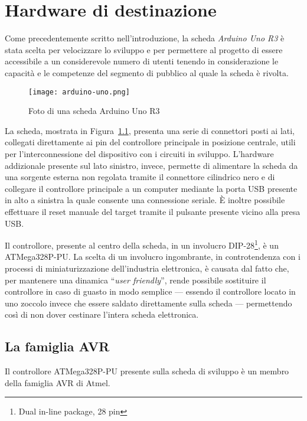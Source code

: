 \chapter{Hardware di destinazione}
    
Come precedentemente scritto nell'introduzione, la scheda \textit{Arduino Uno R3} è stata scelta per velocizzare lo sviluppo e per permettere al progetto di essere accessibile a un considerevole numero di utenti tenendo in considerazione le capacità e le competenze del segmento di pubblico al quale la scheda è rivolta.

\begin{figure}[b]
    \centering
    \texttt{[image: arduino-uno.png]}
    \caption[]{Foto di una scheda Arduino Uno R3\cite{img:arduino-uno-r3}}\label{fig:arduino-uno-r3}
\end{figure}

La scheda, mostrata in Figura~\ref{fig:arduino-uno-r3}, presenta una serie di connettori posti ai lati, collegati direttamente ai pin del controllore principale in posizione centrale, utili per l'interconnessione del dispositivo con i circuiti in sviluppo.
L'hardware addizionale presente sul lato sinistro, invece, permette di alimentare la scheda da una sorgente esterna non regolata tramite il connettore cilindrico nero e di collegare il controllore principale a un computer mediante la porta USB presente in alto a sinistra la quale consente una connessione seriale.
È inoltre possibile effettuare il reset manuale del target tramite il pulsante presente vicino alla presa USB.\@

Il controllore, presente al centro della scheda, in un involucro DIP-28\footnote{Dual in-line package, 28 pin}, è un ATMega328P-PU\cite{site:arduino-uno-doc}. La scelta di un involucro ingombrante, in controtendenza con i processi di miniaturizzazione dell'industria elettronica, è causata dal fatto che, per mantenere una dinamica ``\textit{user friendly}'', rende possibile sostituire il controllore in caso di guasto in modo semplice --- essendo il controllore locato in uno zoccolo invece che essere saldato direttamente sulla scheda --- permettendo così di non dover cestinare l'intera scheda elettronica.\cite{site:arduino-uno-doc}

\section{La famiglia AVR}

Il controllore ATMega328P-PU presente sulla scheda di sviluppo è un membro della famiglia AVR di Atmel\cite[1]{avr:m328p}.

